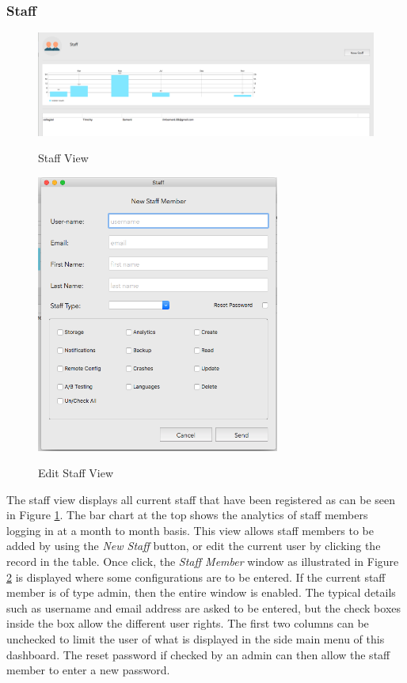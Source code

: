 \subsubsection{Staff}

\begin{figure}[!h]
    \caption{Staff View}
    \centering
    \includegraphics[width=120mm]{images/dashboard/staff}
    \label{fig:staff}
\end{figure} 

\begin{figure}[!h]
    \caption{Edit Staff View}
    \centering
    \includegraphics[width=80mm]{images/dashboard/edit_staff}
    \label{fig:edit_staff}
\end{figure} 

The staff view displays all current staff that have been registered as can be seen in Figure \ref{fig:staff}. The bar chart at the top shows the analytics of staff members logging in at a month to month basis. This view allows staff members to be added by using the \textit{New Staff} button, or edit the current user by clicking the record in the table. Once click, the \textit{Staff Member} window as illustrated in Figure \ref{fig:edit_staff} is displayed where some configurations are to be entered. If the current staff member is of type admin, then the entire window is enabled. The typical details such as username and email address are asked to be entered, but the check boxes inside the box allow the different user rights. The first two columns can be unchecked to limit the user of what is displayed in the side main menu of this dashboard. The reset password if checked by an admin can then allow the staff member to enter a new password.

